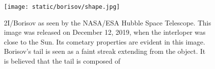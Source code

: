 \begin{figure}[H]
  \centering
  \texttt{[image: static/borisov/shape.jpg]}
\caption[Borisov as seen by the NASA/ESA Hubble Space Telescope]{
  2I/Borisov as seen by the NASA/ESA Hubble Space Telescope. This image was
  released on December 12, 2019, when the interloper was close to the Sun. Its
  cometary properties are evident in this image. Borisov's tail is seen as a
faint streak extending from the object. It is believed that the tail is composed
of 
  }
  \label{fig:borisov_shape}
\end{figure}







%
%
%
%
